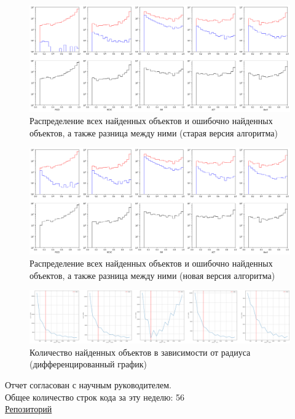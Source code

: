 \documentclass{article}
\begin{document}
\begin{figure}[h]
\includegraphics[width=\linewidth]{hist_old}
\caption{Распределение всех найденных объектов и ошибочно найденных объектов, а также разница между 
ними (старая версия алгоритма)}
\label{Fig:Hist_old}
\end{figure}
\begin{figure}[h]
\includegraphics[width=\linewidth]{hist_new}
\caption{Распределение всех найденных объектов и ошибочно найденных объектов, а также разница между 
ними (новая версия алгоритма)}
\label{Fig:Hist_new}
\end{figure}

\begin{figure}[h]
\includegraphics[width=\linewidth]{rad}
\caption{Количество найденных объектов в зависимости от радиуса (дифференцированный график)}
\label{Fig:rad}
\end{figure}
Отчет согласован с научным руководителем.\\
Общее количество строк кода за эту неделю: 56\\
\href{https://github.com/rt2122/data-segmentation-2}{Репозиторий}\\ 
\end{document}
